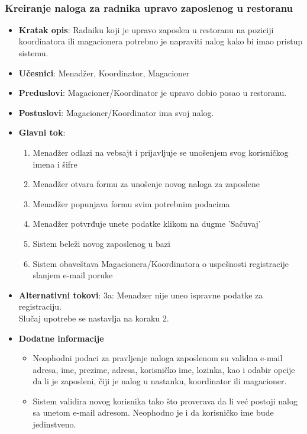  \\
 \subsubsection{Kreiranje naloga za radnika upravo zaposlenog u restoranu}
\begin{itemize}
    \item \textbf{Kratak opis}:
   Radniku koji je upravo zaposlen u restoranu na poziciji koordinatora ili magacionera potrebno je napraviti nalog kako bi imao pristup sistemu.
    \item \textbf{Učesnici}:
    Menadžer, Koordinator, Magacioner
    \item \textbf{Preduslovi}:
    Magacioner/Koordinator je upravo dobio posao u restoranu.
    \item \textbf{Postuslovi}:
    Magacioner/Koordinator ima svoj nalog. 
    \item \textbf{Glavni tok}:
   \begin{enumerate}
        \item Menadžer odlazi na vebsajt i prijavljuje se unošenjem svog korisničkog imena i šifre
        \item Menadžer otvara formu za unošenje novog naloga za zaposlene
        \item Menadžer popunjava formu svim potrebnim podacima
        \item Menadžer potvrđuje unete podatke klikom na dugme 'Sačuvaj'
        \item Sistem beleži novog zaposlenog u bazi
        \item Sistem obaveštava Magacionera/Koordinatora o uspešnosti registracije slanjem e-mail poruke
\end{enumerate}
\end{itemize}
\begin {itemize}
\item \textbf {Alternativni tokovi}: 
 3a: Menadzer nije uneo ispravne podatke za registraciju.\\
 Slučaj upotrebe se nastavlja na koraku 2.
 \end{itemize}
 \begin{itemize} 
     \item \textbf{Dodatne informacije}
 \begin{itemize}
     \item Neophodni podaci za pravljenje naloga zaposlenom su validna e-mail adresa, ime, prezime, adresa, korisničko ime, lozinka, kao i odabir opcije da li je zaposleni, čiji je nalog u nastanku, koordinator ili magacioner.
    \item Sistem validira novog korisnika tako što proverava da li već postoji nalog sa unetom e-mail adresom. Neophodno je i da korisničko ime bude jedinstveno.
 \end{itemize}
 \end{itemize}

